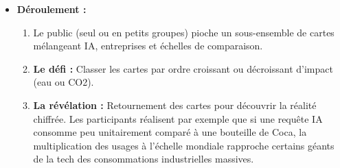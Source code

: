 \documentclass[11pt, a4paper]{article}
\begin{document}
\begin{itemize}
    \item \textbf{Déroulement :} 
    \begin{enumerate}
        \item Le public (seul ou en petits groupes) pioche un sous-ensemble de cartes mélangeant IA, entreprises et échelles de comparaison.
        \item \textbf{Le défi :} Classer les cartes par ordre croissant ou décroissant d'impact (eau ou CO2).
        \item \textbf{La révélation :} Retournement des cartes pour découvrir la réalité chiffrée. Les participants réalisent par exemple que si une requête IA consomme peu unitairement comparé à une bouteille de Coca, la multiplication des usages à l'échelle mondiale rapproche certains géants de la tech des consommations industrielles massives.
    \end{enumerate}
\end{itemize}

\vspace{0.5cm}
\end{document}
